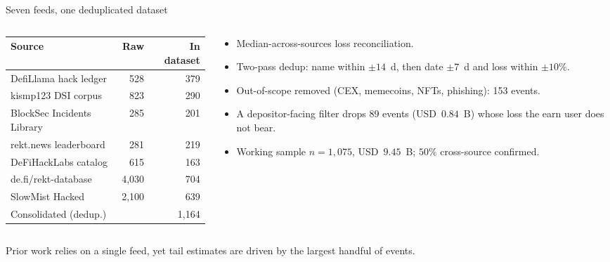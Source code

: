 \documentclass[10pt,xcolor=x11names,aspectratio=169]{beamer}
\begin{document}
\begin{frame}{Seven feeds, one deduplicated dataset}
  \begin{columns}[T]
    \begin{column}{0.53\textwidth}
      \vskip 4mm
      \hspace*{6mm}%
      \small
      \begin{tabular}{l r r}
        \toprule
        Source & Raw & In dataset \\
        \midrule
        DefiLlama hack ledger      &   528 & 379 \\
        kismp123 DSI corpus        &   823 & 290 \\
        BlockSec Incidents Library &   285 & 201 \\
        rekt.news leaderboard      &   281 & 219 \\
        DeFiHackLabs catalog       &   615 & 163 \\
        de.fi/rekt-database        & 4{,}030 & 704 \\
        SlowMist Hacked            & 2{,}100 & 639 \\
        \midrule
        Consolidated (dedup.)      &       & 1{,}164 \\
        \bottomrule
      \end{tabular}
    \end{column}
    \begin{column}{0.43\textwidth}
      \small
      \begin{itemize}
        \item Median-across-sources loss reconciliation.
        \item Two-pass dedup: name within $\pm14$~d, then date $\pm7$~d and
              loss within $\pm10\%$.
        \item Out-of-scope removed (CEX, memecoins, NFTs, phishing): 153 events.
        \item A depositor-facing filter drops 89 events (USD~$0.84$~B)
              whose loss the earn user does not bear.
        \item Working sample $n = 1{,}075$, USD~$9.45$~B;
              $50\%$ cross-source confirmed.
      \end{itemize}
    \end{column}
  \end{columns}
  \begin{takeaway}
    Prior work relies on a single feed, yet tail estimates are driven by the
    largest handful of events.
  \end{takeaway}
\end{frame}
\end{document}
